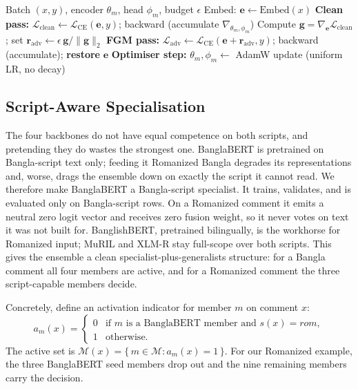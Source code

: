 \documentclass[11pt,a4paper]{article}
\def\cref#1{section}%
\def\texttt#1{#1}%
\def\textsc#1{#1}%
\begin{document}
\begin{algorithm}[!htbp]
\caption{Cross-entropy $+$ FGM fine-tuning of one backbone (single mini-batch).}
\label{alg:fgm}
\begin{algorithmic}[1]
\Require Batch $(x, y)$, encoder $\theta_m$, head $\phi_m$, budget $\epsilon$
\State Embed: $\mathbf{e} \leftarrow \mathrm{Embed}(x)$
\State \textbf{Clean pass:} $\mathcal{L}_{\mathrm{clean}} \leftarrow \mathcal{L}_{\mathrm{CE}}(\mathbf{e}, y)$;\; \texttt{backward} (accumulate $\nabla_{\theta_m,\phi_m}$)
\State Compute $\mathbf{g} = \nabla_{\mathbf{e}}\mathcal{L}_{\mathrm{clean}}$;\; set $\mathbf{r}_{\mathrm{adv}} \leftarrow \epsilon\,\mathbf{g}/\|\mathbf{g}\|_2$ \Comment{\cref{eq:fgm}}
\State \textbf{FGM pass:} $\mathcal{L}_{\mathrm{adv}} \leftarrow \mathcal{L}_{\mathrm{CE}}(\mathbf{e} + \mathbf{r}_{\mathrm{adv}}, y)$;\; \texttt{backward} (accumulate);\; \textbf{restore} $\mathbf{e}$
\State \textbf{Optimiser step:} $\theta_m, \phi_m \leftarrow$ AdamW update (uniform LR, no decay)
\end{algorithmic}
\end{algorithm}

\subsection{Script-Aware Specialisation}
\label{sec:scriptaware}

The four backbones do not have equal competence on both scripts, and pretending they do wastes the strongest one. BanglaBERT is pretrained on Bangla-script text only; feeding it Romanized Bangla degrades its representations and, worse, drags the ensemble down on exactly the script it cannot read. We therefore make BanglaBERT a Bangla-script specialist. It trains, validates, and is evaluated only on Bangla-script rows. On a Romanized comment it emits a neutral zero logit vector and receives zero fusion weight, so it never votes on text it was not built for. BanglishBERT, pretrained bilingually, is the workhorse for Romanized input; MuRIL and XLM-R stay full-scope over both scripts. This gives the ensemble a clean specialist-plus-generalists structure: for a Bangla comment all four members are active, and for a Romanized comment the three script-capable members decide.

Concretely, define an activation indicator for member $m$ on comment $x$:
\begin{equation}
a_m(x) =
\begin{cases}
0 & \text{if } m \text{ is a BanglaBERT member and } s(x) = \textsc{rom},\\
1 & \text{otherwise.}
\end{cases}
\label{eq:activation}
\end{equation}
The active set is $\mathcal{M}(x) = \{\, m \in \mathcal{M} : a_m(x) = 1 \,\}$. For our Romanized example, the three BanglaBERT seed members drop out and the nine remaining members carry the decision.
\end{document}
